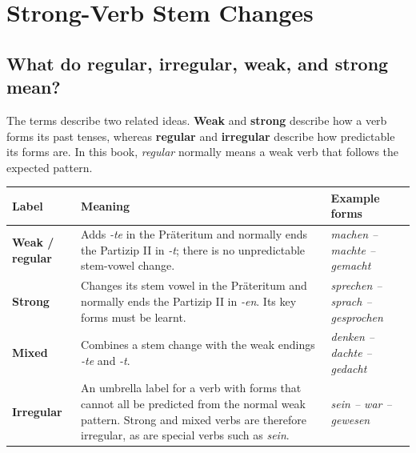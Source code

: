 \chapter{Strong-Verb Stem Changes}

\section{What do regular, irregular, weak, and strong mean?}

The terms describe two related ideas. \textbf{Weak} and \textbf{strong}
describe how a verb forms its past tenses, whereas \textbf{regular} and
\textbf{irregular} describe how predictable its forms are. In this book,
\textit{regular} normally means a weak verb that follows the expected pattern.

\begin{center}
\small
{}
\begin{tabularx}{\textwidth}{@{}>{\bfseries}p{} X p{}@{}}
\toprule
Label & Meaning & Example forms \\
\midrule
Weak / regular & Adds \textit{-te} in the Präteritum and normally
ends the Partizip II in \textit{-t}; there is no unpredictable stem-vowel
change. & \textit{machen -- machte -- gemacht} \\
Strong & Changes its stem vowel in the Präteritum and normally ends the
Partizip II in \textit{-en}. Its key forms must be learnt. &
\textit{sprechen -- sprach -- gesprochen} \\
Mixed & Combines a stem change with the weak endings \textit{-te} and
\textit{-t}. & \textit{denken -- dachte -- gedacht} \\
Irregular & An umbrella label for a verb with forms that cannot all be
predicted from the normal weak pattern. Strong and mixed verbs are therefore
irregular, as are special verbs such as \textit{sein}. &
\textit{sein -- war -- gewesen} \\
\bottomrule
\end{tabularx}
\end{center}

